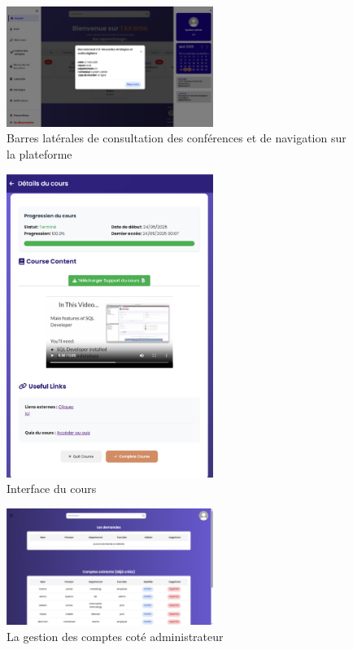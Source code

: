 \documentclass{article}
\begin{document}
\begin{figure}[H]
  \centering
  \includegraphics[width=0.6\textwidth]{coné.png}
  \caption{Barres latérales de consultation des conférences et de navigation sur la plateforme}
  \label{fig:dashboard3}
\end{figure}

\begin{figure}[H]
  \centering
  \includegraphics[width=0.6\textwidth]{courr.png}
  \caption{Interface du cours}
  \label{fig:dashboard2}
\end{figure}

\begin{figure}[H]
  \centering
  \includegraphics[width=0.6\textwidth]{compte.png}
  \caption{La gestion des comptes coté administrateur}
  \label{fig:comptr}
\end{figure}
\end{document}
